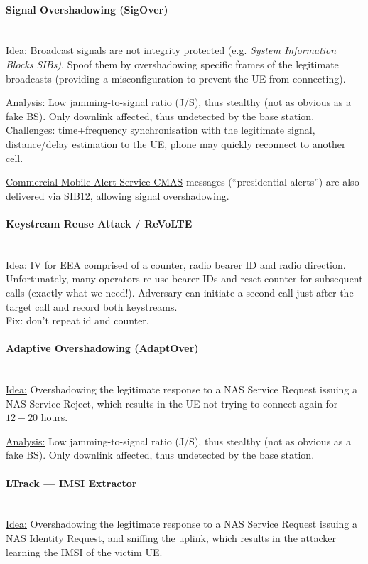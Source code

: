\paragraph{Signal Overshadowing (SigOver)} \mbox{} \\
\underline{Idea:}
Broadcast signals are not integrity protected (e.g. \textit{System Information Blocks SIBs)}.
Spoof them by overshadowing specific frames of the legitimate broadcasts (providing a misconfiguration to prevent the UE from connecting).

\underline{Analysis:}
Low jamming-to-signal ratio (J/S), thus stealthy (not as obvious as a fake BS).
Only downlink affected, thus undetected by the base station.
Challenges: time+frequency synchronisation with the legitimate signal, distance/delay estimation to the UE, phone may quickly reconnect to another cell.

\underline{Commercial Mobile Alert Service CMAS} messages (``presidential alerts'') are also delivered via SIB12, allowing signal overshadowing.

\paragraph{Keystream Reuse Attack / ReVoLTE} \mbox{} \\
\underline{Idea:} IV for EEA comprised of a counter, radio bearer ID and radio direction.
\\
Unfortunately, many operators re-use bearer IDs and reset counter for subsequent calls (exactly what we need!).
Adversary can initiate a second call just after the target call and record both keystreams.
\\
Fix: don't repeat id and counter.

\paragraph{Adaptive Overshadowing (AdaptOver)} \mbox{} \\
\underline{Idea:}
Overshadowing the legitimate response to a NAS Service Request issuing a NAS Service Reject, which results in the UE not trying to connect again for $12-20$ hours.

\underline{Analysis:}
Low jamming-to-signal ratio (J/S), thus stealthy (not as obvious as a fake BS).
Only downlink affected, thus undetected by the base station.

\paragraph{LTrack --- IMSI Extractor} \mbox{} \\
\underline{Idea:}
Overshadowing the legitimate response to a NAS Service Request issuing a NAS Identity Request, and sniffing the uplink, which results in the attacker learning the IMSI of the victim UE.

